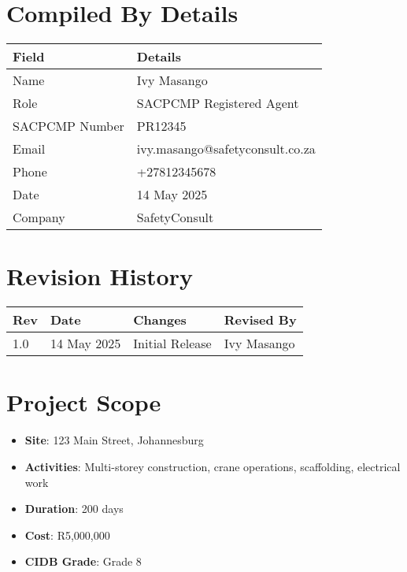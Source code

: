 \documentclass[11pt]{article}
\makeatletter
\newcommand{\issueDate}{14 May 2025}
\newcommand{\compilerName}{Ivy Masango}
\newcommand{\compilerRole}{SACPCMP Registered Agent}
\newcommand{\compilerSACPCMP}{PR12345}
\newcommand{\compilerEmail}{ivy.masango@safetyconsult.co.za}
\newcommand{\compilerPhone}{+27812345678}
\newcommand{\compilerCompany}{SafetyConsult}
\newcommand{\projectDuration}{200 days}
\newcommand{\projectCost}{R5,000,000}
\newcommand{\cidbGrade}{Grade 8}
\makeatother
\begin{document}
\section{Compiled By Details}
\begin{tabularx}{\textwidth}{lX}
  \toprule
  \textbf{Field} & \textbf{Details} \\
  \midrule
  Name & \compilerName \\
  Role & \compilerRole \\
  SACPCMP Number & \compilerSACPCMP \\
  Email & \compilerEmail \\
  Phone & \compilerPhone \\
  Date & \issueDate \\
  Company & \compilerCompany \\
  \bottomrule
\end{tabularx}

\section{Revision History}
\begin{tabularx}{\textwidth}{lXll}
  \toprule
  \textbf{Rev} & \textbf{Date} & \textbf{Changes} & \textbf{Revised By} \\
  \midrule
  1.0 & \issueDate & Initial Release & \compilerName \\
  \bottomrule
\end{tabularx}

\section{Project Scope}
\begin{itemize}
  \item \textbf{Site}: 123 Main Street, Johannesburg
  \item \textbf{Activities}: Multi-storey construction, crane operations, scaffolding, electrical work
  \item \textbf{Duration}: \projectDuration
  \item \textbf{Cost}: \projectCost
  \item \textbf{CIDB Grade}: \cidbGrade
\end{itemize}

\end{document}
